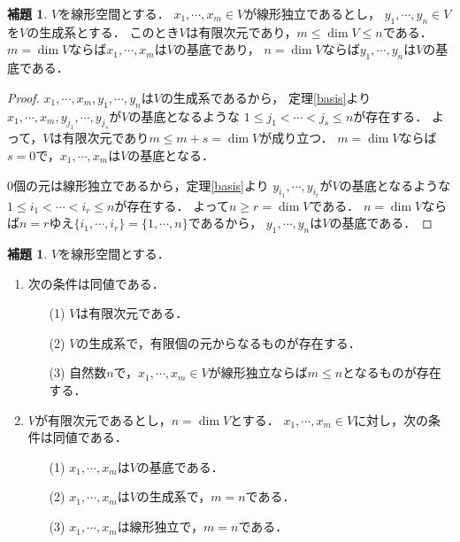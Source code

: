\documentclass{jsarticle}
\theoremstyle{definition}
\newtheorem{lem}[defi]{補題}
\begin{document}
\begin{lem}\label{lem1}
$V$を線形空間とする．
$x_1,\cdots,x_m\in V$が線形独立であるとし，
$y_1,\cdots,y_n\in V$を$V$の生成系とする．
このとき$V$は有限次元であり，$m\leq\dim{V}\leq n$である．
$m=\dim{V}$ならば$x_1,\cdots,x_m$は$V$の基底であり，
$n=\dim{V}$ならば$y_1,\cdots,y_n$は$V$の基底である．
\end{lem}

\begin{proof}
$x_1,\cdots,x_m,y_1,\cdots,y_n$は$V$の生成系であるから，
定理\ref{basis}より$x_1,\cdots,x_m,y_{j_1},\cdots,y_{j_s}$が$V$の基底となるような
$1\leq j_1<\cdots<j_s\leq n$が存在する．
よって，$V$は有限次元であり$m\leq m+s=\dim{V}$が成り立つ．
$m=\dim{V}$ならば$s=0$で，$x_1,\cdots,x_m$は$V$の基底となる．

0個の元は線形独立であるから，定理\ref{basis}より
$y_{i_1},\cdots,y_{i_r}$が$V$の基底となるような
$1\leq i_1<\cdots<i_r\leq n$が存在する．
よって$n\geq r=\dim{V}$である．
$n=\dim{V}$ならば$n=r$ゆえ$\{i_1,\cdots,i_r\}=\{1,\cdots,n\}$であるから，
$y_1,\cdots,y_n$は$V$の基底である．
\end{proof}

\begin{lem}\label{lem2}
$V$を線形空間とする．
\begin{enumerate}
\item 次の条件は同値である．
\begin{itemize}
\item[(1)]$V$は有限次元である．
\item[(2)]$V$の生成系で，有限個の元からなるものが存在する．
\item[(3)]自然数$n$で，$x_1,\cdots,x_m\in V$が線形独立ならば$m\leq n$となるものが存在する．
\end{itemize}
\item $V$が有限次元であるとし，$n=\dim{V}$とする．
$x_1,\cdots,x_m\in V$に対し，次の条件は同値である．
\begin{itemize}
\item[(1)]$x_1,\cdots,x_m$は$V$の基底である．
\item[(2)]$x_1,\cdots,x_m$は$V$の生成系で，$m=n$である．
\item[(3)]$x_1,\cdots,x_m$は線形独立で，$m=n$である．
\end{itemize}
\end{enumerate}
\end{lem}
\end{document}
